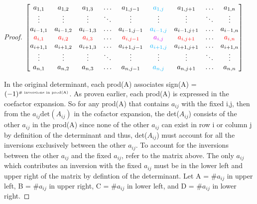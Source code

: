 \begin{proof}
        \hspace{0.5cm}
        $
        \begin{bmatrix}
            a_{1,1} & a_{1,2} & a_{1,3} & \hdots
                    & a_{1,j-1} & {\color{lblue} a_{1,j}}
                    & a_{1,j+1} & \hdots & a_{1,n} \\
            \vdots & \vdots & \vdots & \ddots
                    & \vdots & \vdots & \vdots & \ddots & \vdots \\
            a_{i-1,1} & a_{i-1,2} & a_{i-1,3} & \hdots
                    & a_{i-1,j-1} & {\color{lblue} a_{i-1,j}}
                    & a_{i-1,j+1} & \hdots & a_{i-1,n} \\
            {\color{red} a_{i,1}} & {\color{red} a_{i,2}} & {\color{red} a_{i,3}}
                & \hdots & {\color{red} a_{i,j-1}} & {\color{purple} a_{i,j}}
                & {\color{red} a_{i,j+1}} & \hdots & {\color{red} a_{i,n}} \\
            a_{i+1,1} & a_{i+1,2} & a_{i+1,3} & \hdots
                    & a_{i+1,j-1} & {\color{lblue} a_{i+1,j}}
                    & a_{i+1,j+1} & \hdots & a_{i+1,n} \\
            \vdots & \vdots & \vdots & \ddots
                    & \vdots & \vdots & \vdots & \ddots & \vdots \\
            a_{n,1} & a_{n,2} & a_{n,3} & \hdots
                    & a_{n,j-1} & {\color{lblue} a_{n,j}}
                    & a_{n,j+1} & \hdots & a_{n,n} \\
        \end{bmatrix}
        $

        In the original determinant, each prod(A) associates
        sign(A) = $(-1)^{\text{\tiny \# inversions in prod(A)}}$.
        As proven earlier, each prod(A) is expressed in the coefactor expansion.
        So for any prod(A) that contains $a_{ij}$ with the fixed i,j, then from the
        $a_{ij}\text{det}(A_{ij})$ in the cofactor expansion, the
        det($A_{ij}$) consists of the other $a_{ij}$ in the prod(A)
        since none of the other $a_{ij}$ can exist in row i or column j
        by definition of the determinant and thus, det($A_{ij}$) must account
        for all the inversions exclusively between the other $a_{ij}$.
        To account for the inversions between the other $a_{ij}$
        and the fixed $a_{ij}$, refer to the matrix above.
        The only $a_{ij}$ which contributes an inversion with the fixed $a_{ij}$
        must be in the lower left and upper right of the matrix
        by defintion of the determinant.
        Let A = \#$a_{ij}$ in upper left, B = \#$a_{ij}$ in upper right,
        C = \#$a_{ij}$ in lower left, and D = \#$a_{ij}$ in lower right.


\end{proof}
